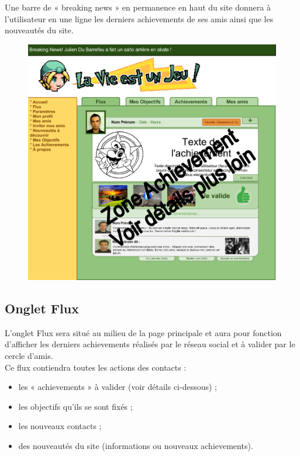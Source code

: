 \documentclass{life-fr}
\begin{document}
Une barre de « breaking news » en permanence en haut du site donnera à l'utilisateur en une ligne les derniers achievements de ses amis ainsi que les nouveautés du site.

\begin{figure}[H]
  \begin{center}
    \includegraphics[width=15cm]{img/accueil.png}
  \end{center}
\end{figure}


\subsection{Onglet Flux}

L'onglet Flux sera situé au milieu de la page principale et aura pour fonction d'afficher les derniers achievements réalisés par le réseau social et à valider par le cercle d'amis.\\

Ce flux contiendra toutes les actions des contacts :

\begin{itemize}
  \item les « achievements » à valider (voir détails ci-dessous) ;
  \item les objectifs qu'ils se sont fixés ;
  \item les nouveaux contacts ;
  \item des nouveautés du site (informations ou nouveaux achievements).
\end{itemize}
\end{document}
